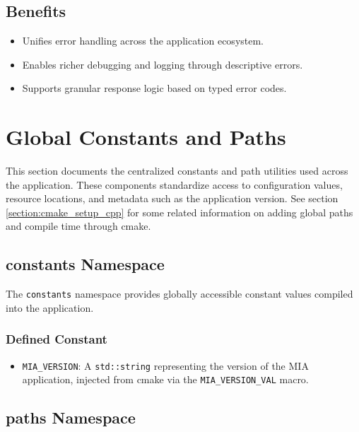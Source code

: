 \subsection*{Benefits}
\begin{itemize}\itemsep0em
	\item Unifies error handling across the application ecosystem.
	\item Enables richer debugging and logging through descriptive errors.
	\item Supports granular response logic based on typed error codes.
\end{itemize}








\section{Global Constants and Paths}
\label{section:global_constants_and_paths}

This section documents the centralized constants and path utilities used across the application. These components standardize access to configuration values, resource locations, and metadata such as the application version. See section \ref{section:cmake_setup_cpp} for some related information on adding global paths and compile time through cmake.

\subsection{constants Namespace}

The \texttt{constants} namespace provides globally accessible constant values compiled into the application.

\subsubsection*{Defined Constant}
\begin{itemize}\itemsep0em
	\item \texttt{MIA\_VERSION}: A \texttt{std::string} representing the version of the MIA application, injected from cmake via the \texttt{MIA\_VERSION\_VAL} macro.
\end{itemize}

\subsection{paths Namespace}

